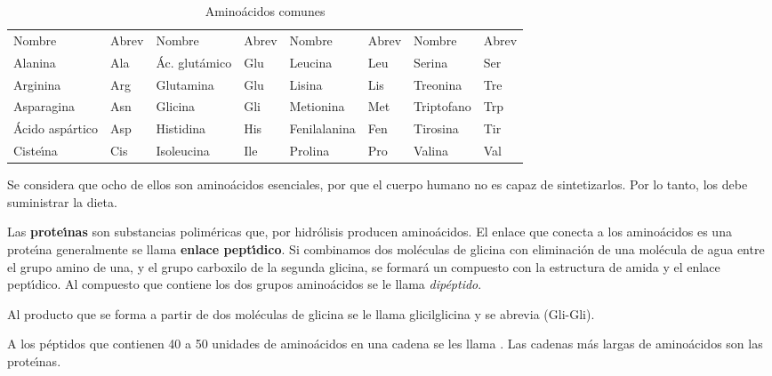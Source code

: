 \begin{table}[hbt]
\caption{Amino\'acidos comunes}
\label{aminoa}
{\footnotesize \begin{tabular}{llllllll}
&\\\hline
Nombre&{\tiny Abrev}&Nombre&{\tiny
Abrev}&Nombre&{\tiny Abrev}&Nombre&{\tiny Abrev}\\\hline Alanina   &Ala& \'Ac.
glut\'amico&Glu & Leucina &Leu& Serina&Ser\\ Arginina  &Arg&
Glutamina          &Glu& Lisina   &Lis& Treonina&Tre\\ Asparagina&Asn&
Glicina            &Gli& Metionina&Met& Triptofano&Trp\\
\'Acido asp\'artico&Asp&Histidina  &His& Fenilalanina&Fen& Tirosina&Tir\\
Ciste\'{\i}na&Cis& Isoleucina      &Ile& Prolina  &Pro& Valina&Val\\
\hline
\end{tabular}}
\end{table}

Se considera que ocho de ellos son amino\'acidos esenciales, por que el cuerpo humano no es capaz de sintetizarlos. Por lo tanto, los debe
suministrar la dieta.

Las \textbf{prote\'{\i}nas}  son substancias polim\'ericas que, por hidr\'olisis producen ami\-no\-\'acidos. El enlace  que conecta a los amino\'acidos es una prote\'{\i}na generalmente se llama \textbf{enlace pept\'{\i}dico}.  Si combinamos dos mol\'eculas de glicina con eliminaci\'on de una mol\'ecula de agua entre el grupo amino de una, y el grupo carboxilo de la segunda glicina, se formar\'a un compuesto con la estructura de amida y el enlace pept\'{\i}dico. Al compuesto que contiene los dos grupos amino\'acidos se le llama \textit{dip\'eptido}.

Al producto que se forma a partir de dos mol\'eculas de glicina se le llama glicilglicina  y se abrevia (Gli-Gli).

A los p\'eptidos que contienen 40 a 50 unidades de amino\'acidos en una cadena se les llama \textbf{}. Las cadenas m\'as largas de amino\'acidos son las prote\'{\i}nas.

